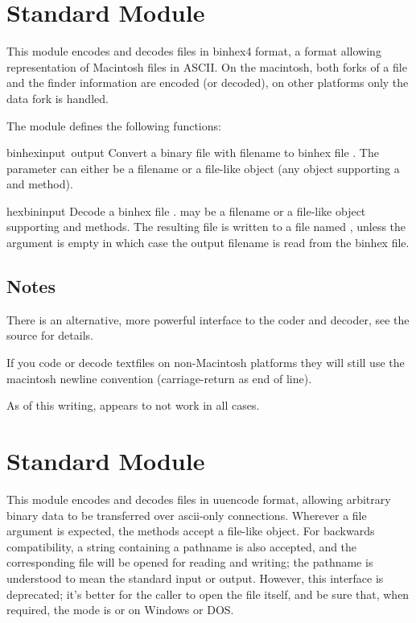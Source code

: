 \section{Standard Module }
\label{module-binhex}

This module encodes and decodes files in binhex4 format, a format
allowing representation of Macintosh files in ASCII. On the macintosh,
both forks of a file and the finder information are encoded (or
decoded), on other platforms only the data fork is handled.

The  module defines the following functions:


\begin{funcdesc}{binhex}{input\, output}
Convert a binary file with filename  to binhex file
. The  parameter can either be a filename or a
file-like object (any object supporting a  and 
method).
\end{funcdesc}

\begin{funcdesc}{hexbin}{input}
Decode a binhex file .  may be a filename or a
file-like object supporting  and  methods.
The resulting file is written to a file named , unless the
argument is empty in which case the output filename is read from the
binhex file.
\end{funcdesc}

\subsection{Notes}
There is an alternative, more powerful interface to the coder and
decoder, see the source for details.

If you code or decode textfiles on non-Macintosh platforms they will
still use the macintosh newline convention (carriage-return as end of
line).

As of this writing,  appears to not work in all cases.

\section{Standard Module }

This module encodes and decodes files in uuencode format, allowing
arbitrary binary data to be transferred over ascii-only connections.
Wherever a file argument is expected, the methods accept a file-like
object.  For backwards compatibility, a string containing a pathname
is also accepted, and the corresponding file will be opened for
reading and writing; the pathname  is understood to mean the
standard input or output.  However, this interface is deprecated; it's
better for the caller to open the file itself, and be sure that, when
required, the mode is  or  on Windows or DOS.

